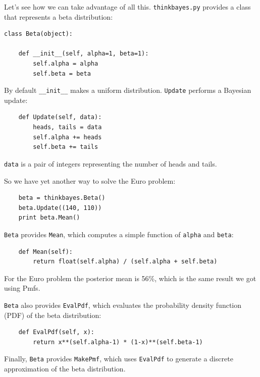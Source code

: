 \documentclass[12pt]{book}
\begin{document}
Let's see how we can take advantage of all this.  
{\tt thinkbayes.py} provides 
a class that represents a beta distribution:

\begin{verbatim}
class Beta(object):

    def __init__(self, alpha=1, beta=1):
        self.alpha = alpha
        self.beta = beta
\end{verbatim}

By default \verb"__init__" makes a uniform distribution.
{\tt Update} performs a Bayesian update:

\begin{verbatim}
    def Update(self, data):
        heads, tails = data
        self.alpha += heads
        self.beta += tails
\end{verbatim}

{\tt data} is a pair of integers representing the number of
heads and tails.

So we have yet another way to solve the Euro problem:

\begin{verbatim}
    beta = thinkbayes.Beta()
    beta.Update((140, 110))
    print beta.Mean()
\end{verbatim}

{\tt Beta} provides {\tt Mean}, which 
computes a simple function of {\tt alpha}
and {\tt beta}:

\begin{verbatim}
    def Mean(self):
        return float(self.alpha) / (self.alpha + self.beta)
\end{verbatim}

For the Euro problem the posterior mean is 56\%, which is the
same result we got using Pmfs.  

{\tt Beta} also provides {\tt EvalPdf}, which evaluates
the probability density
function (PDF)  of the beta distribution:

\begin{verbatim}
    def EvalPdf(self, x):
        return x**(self.alpha-1) * (1-x)**(self.beta-1)
\end{verbatim}

Finally, {\tt Beta} provides {\tt MakePmf}, which
uses {\tt EvalPdf} to generate a discrete approximation
of the beta distribution.


\end{document}
